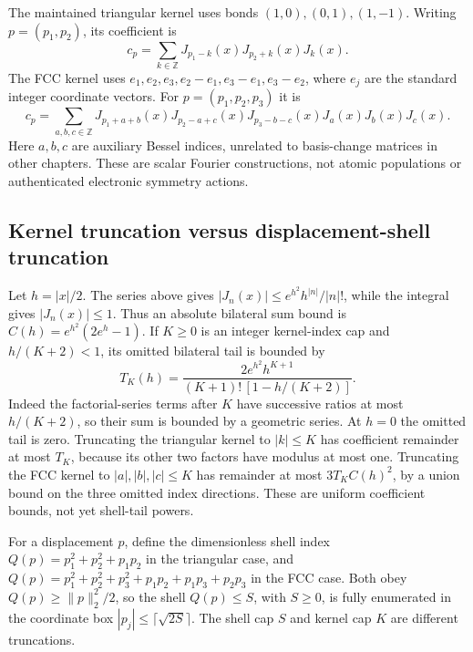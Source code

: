 The maintained triangular kernel uses bonds $(1,0),(0,1),(1,-1)$.
Writing $p=(p_1,p_2)$, its coefficient is
\begin{equation}
 c_p=\sum_{k\in\mathbb Z}J_{p_1-k}(x)J_{p_2+k}(x)J_k(x).
 \label{eq:auxiliary-triangular-bessel-kernel}
\end{equation}
The FCC kernel uses $e_1,e_2,e_3,e_2-e_1,e_3-e_1,e_3-e_2$, where $e_j$
are the standard integer coordinate vectors. For $p=(p_1,p_2,p_3)$ it is
\begin{equation}
 c_p=\sum_{a,b,c\in\mathbb Z}
 J_{p_1+a+b}(x)J_{p_2-a+c}(x)J_{p_3-b-c}(x)J_a(x)J_b(x)J_c(x).
 \label{eq:auxiliary-fcc-bessel-kernel}
\end{equation}
Here $a,b,c$ are auxiliary Bessel indices, unrelated to basis-change matrices
in other chapters. These are scalar Fourier constructions, not atomic
populations or authenticated electronic symmetry actions.

\subsection{Kernel truncation versus displacement-shell truncation}

Let $h=|x|/2$. The series above gives
$|J_n(x)|\leq e^{h^2}h^{|n|}/|n|!$, while the integral gives $|J_n(x)|\leq1$.
Thus an absolute bilateral sum bound is
$C(h)=e^{h^2}(2e^h-1)$. If $K\geq0$ is an integer kernel-index cap and
$h/(K+2)<1$, its omitted bilateral tail is bounded by
\begin{equation}
 T_K(h)=\frac{2e^{h^2}h^{K+1}}{(K+1)!\,[1-h/(K+2)]}.
 \label{eq:auxiliary-bessel-index-tail}
\end{equation}
Indeed the factorial-series terms after $K$ have successive ratios at most
$h/(K+2)$, so their sum is bounded by a geometric series. At $h=0$ the
omitted tail is zero. Truncating the triangular kernel to $|k|\leq K$
has coefficient remainder at most $T_K$, because its other two factors have
modulus at most one. Truncating the FCC kernel to $|a|,|b|,|c|\leq K$
has remainder at most $3T_K C(h)^2$, by a union bound on the three omitted
index directions. These are uniform coefficient bounds, not yet shell-tail
powers.

For a displacement $p$, define the dimensionless shell index
$Q(p)=p_1^2+p_2^2+p_1p_2$ in the triangular case, and
$Q(p)=p_1^2+p_2^2+p_3^2+p_1p_2+p_1p_3+p_2p_3$ in the FCC case.
Both obey $Q(p)\geq\|p\|_2^2/2$, so the shell $Q(p)\leq S$, with
$S\geq0$, is fully enumerated in the coordinate box
$|p_j|\leq\lceil\sqrt{2S}\rceil$. The shell cap $S$ and kernel cap $K$
are different truncations.

